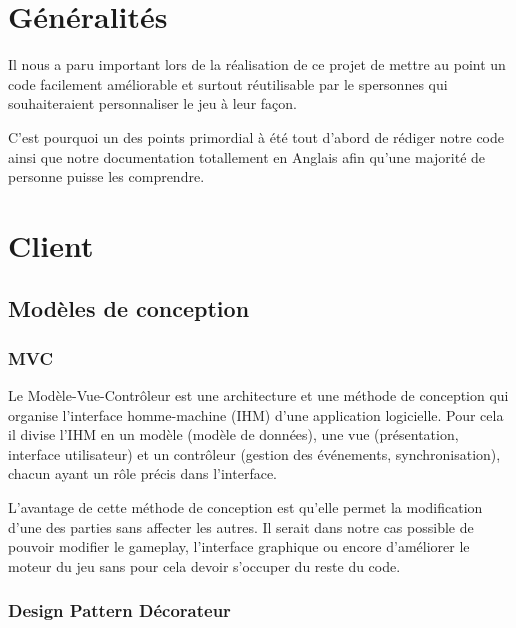 \section{Généralités}

	Il nous a paru important lors de la réalisation de ce projet
	de mettre au point un code facilement améliorable et surtout
	réutilisable par le spersonnes qui souhaiteraient personnaliser
	le jeu à leur façon.
	
	C'est pourquoi un des points primordial à été tout d'abord de
	rédiger notre code ainsi que notre documentation totallement 
	en Anglais afin qu'une majorité de personne puisse les comprendre.

\section{Client}

	\subsection{Modèles de conception}
	
		\subsubsection{MVC}
		
			Le Modèle-Vue-Contrôleur est une architecture et une méthode de
			conception qui organise l'interface homme-machine (IHM) d'une 
			application logicielle.
			Pour cela il divise l'IHM en un modèle (modèle de données),
			une vue (présentation, interface utilisateur) et un contrôleur
			(gestion des événements, synchronisation), chacun ayant un rôle
			précis dans l'interface.
			
			\begin{center}
			\end{center} 
			
			L'avantage de cette méthode de conception est qu'elle permet la
			modification d'une des parties sans affecter les autres.
			Il serait dans notre cas possible de pouvoir modifier le gameplay,
			l'interface graphique ou encore d'améliorer le moteur du jeu sans pour
			cela devoir s'occuper du reste du code.		
		
		\subsubsection{Design Pattern Décorateur}
		
